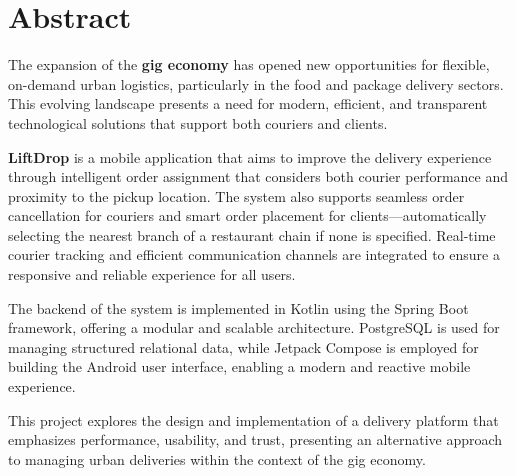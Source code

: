 \section*{Abstract}

The expansion of the \textbf{gig economy} has opened new opportunities for flexible, on-demand urban logistics, particularly in the food and package delivery sectors. This evolving landscape presents a need for modern, efficient, and transparent technological solutions that support both couriers and clients.

\textbf{LiftDrop} is a mobile application that aims to improve the delivery experience through intelligent order assignment that considers both courier performance and proximity to the pickup location. The system also supports seamless order cancellation for couriers and smart order placement for clients—automatically selecting the nearest branch of a restaurant chain if none is specified. Real-time courier tracking and efficient communication channels are integrated to ensure a responsive and reliable experience for all users.

The backend of the system is implemented in Kotlin using the Spring Boot framework, offering a modular and scalable architecture. PostgreSQL is used for managing structured relational data, while Jetpack Compose is employed for building the Android user interface, enabling a modern and reactive mobile experience.

This project explores the design and implementation of a delivery platform that emphasizes performance, usability, and trust, presenting an alternative approach to managing urban deliveries within the context of the gig economy.

